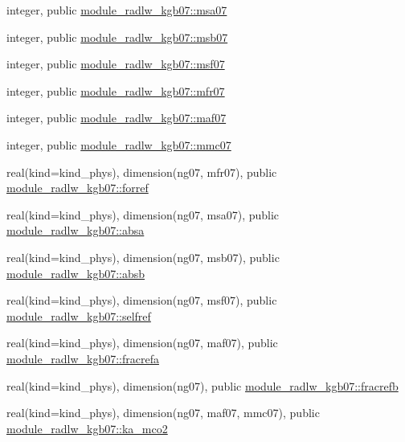 \begin{DoxyCompactItemize}
\item 
integer, public \hyperlink{namespacemodule__radlw__kgb07_a0acb84a6b261fc00f1765707844c32f2}{module\+\_\+radlw\+\_\+kgb07\+::msa07}
\item 
integer, public \hyperlink{namespacemodule__radlw__kgb07_abba2139dfc5d8551f844f3809c28ce3c}{module\+\_\+radlw\+\_\+kgb07\+::msb07}
\item 
integer, public \hyperlink{namespacemodule__radlw__kgb07_a9310f33501467fbadcf092d71559358b}{module\+\_\+radlw\+\_\+kgb07\+::msf07}
\item 
integer, public \hyperlink{namespacemodule__radlw__kgb07_a0bd5d550553238ae13cbf57423d102c8}{module\+\_\+radlw\+\_\+kgb07\+::mfr07}
\item 
integer, public \hyperlink{namespacemodule__radlw__kgb07_a21ac454fe21fb07ee555b4106121b2ae}{module\+\_\+radlw\+\_\+kgb07\+::maf07}
\item 
integer, public \hyperlink{namespacemodule__radlw__kgb07_a2d176bec938d9fdcc2369fda91308702}{module\+\_\+radlw\+\_\+kgb07\+::mmc07}
\item 
real(kind=kind\+\_\+phys), dimension(ng07, mfr07), public \hyperlink{namespacemodule__radlw__kgb07_a43ceef4cb2707a2874c2d59e93ba9791}{module\+\_\+radlw\+\_\+kgb07\+::forref}
\item 
real(kind=kind\+\_\+phys), dimension(ng07, msa07), public \hyperlink{namespacemodule__radlw__kgb07_af106cf054f7496a092ceb0c399753a36}{module\+\_\+radlw\+\_\+kgb07\+::absa}
\item 
real(kind=kind\+\_\+phys), dimension(ng07, msb07), public \hyperlink{namespacemodule__radlw__kgb07_ab0478438e9bbe64401aa492510f8d4bb}{module\+\_\+radlw\+\_\+kgb07\+::absb}
\item 
real(kind=kind\+\_\+phys), dimension(ng07, msf07), public \hyperlink{namespacemodule__radlw__kgb07_aaf6d41f390a0465af92756b9c3e6c558}{module\+\_\+radlw\+\_\+kgb07\+::selfref}
\item 
real(kind=kind\+\_\+phys), dimension(ng07, maf07), public \hyperlink{namespacemodule__radlw__kgb07_a07f2a4a0f1152a65aed68623f14a9ae4}{module\+\_\+radlw\+\_\+kgb07\+::fracrefa}
\item 
real(kind=kind\+\_\+phys), dimension(ng07), public \hyperlink{namespacemodule__radlw__kgb07_aa16eb60406e5a298e380b55af528791a}{module\+\_\+radlw\+\_\+kgb07\+::fracrefb}
\item 
real(kind=kind\+\_\+phys), dimension(ng07, maf07, mmc07), public \hyperlink{namespacemodule__radlw__kgb07_a3fdad494f3d3fcf9306da6a81d97bd43}{module\+\_\+radlw\+\_\+kgb07\+::ka\+\_\+mco2}

\end{DoxyCompactItemize}
